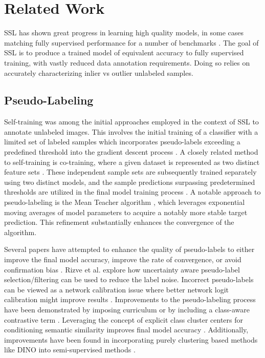 \documentclass[10pt,twocolumn,letterpaper]{article}
\begin{document}
\section{Related Work}


SSL has shown great progress in learning high quality models, in some cases matching fully supervised performance for a number of benchmarks \cite{zhang2021flexmatch}.
The goal of SSL is to produce a trained model of equivalent accuracy to fully supervised training, with vastly reduced data annotation requirements.
Doing so relies on accurately characterizing inlier vs outlier unlabeled samples.

\subsection{Pseudo-Labeling}
Self-training was among the initial approaches employed in the context of SSL to annotate unlabeled images. 
This involves the initial training of a classifier with a limited set of labeled samples which incorporates pseudo-labels exceeding a predefined threshold into the gradient descent process \cite{yarowsky1995unsupervised, mcclosky2006reranking, olivier2006semi,zhai2019s4l,livieris2019predicting,rosenberg2005semi,menon2020deep}. 
A closely related method to self-training is co-training, where a given dataset is represented as two distinct feature sets \cite{blum1998combining}. 
These independent sample sets are subsequently trained separately using two distinct models, and the sample predictions surpassing predetermined thresholds are utilized in the final model training process \cite{blum1998combining,prakash2014survey}.
A notable approach to pseudo-labeling is the Mean Teacher algorithm \cite{tarvainen2017mean}, which leverages exponential moving averages of model parameters to acquire a notably more stable target prediction. 
This refinement substantially enhances the convergence of the algorithm.

Several papers have attempted to enhance the quality of pseudo-labels to either improve the final model accuracy, improve the rate of convergence, or avoid confirmation bias \cite{arazo2020pseudo}.
Rizve et al. \cite{rizve2021defense} explore how uncertainty aware pseudo-label selection/filtering can be used to reduce the label noise.
Incorrect pseudo-labels can be viewed as a network calibration issue \cite{rizve2021defense} where better network logit calibration might improve results \cite{Xing2020DistanceBased}.
Improvements to the pseudo-labeling process have been demonstrated by imposing curriculum \cite{zhang2021flexmatch} or by including a class-aware contrastive term \cite{yang2022class}.
Leveraging the concept of explicit class cluster centers for conditioning semantic similarity improves final model accuracy \cite{zheng2022simmatch}.
Additionally, improvements have been found in incorporating purely clustering based methods like DINO \cite{caron2021emerging} into semi-supervised methods \cite{fini2023semi}.
\end{document}
